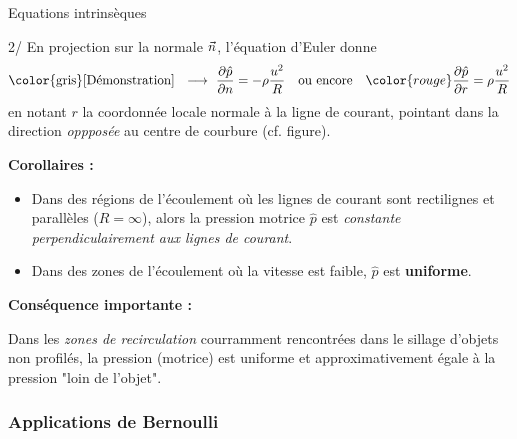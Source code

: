 \begin{frame}{Equations intrinsèques }
\pause

\smallskip

2/ En projection sur la normale $\vec{n}$, l'équation d'Euler
donne
\[
  \mbox{\color{gris} [Démonstration] \; $\longrightarrow$ \;}
  \frac{\partial \hat{p}}{\partial n} = - \rho \frac{u^2}{R}
  \quad \mbox{ou encore} \quad
  \color{rouge}
  \frac{\partial \hat{p}}{\partial r} = \rho \frac{u^2}{R}
\]
en notant $r$ la coordonnée locale normale à la ligne de courant, pointant
dans la direction \textsl{oppposée} au centre de courbure (cf. figure). 

\pause

\medskip

{\bf Corollaires  :}

\begin{itemize}

\item 
Dans des régions de l'écoulement o\`u les lignes de courant sont rectilignes et parallèles 
($R=\infty$), alors la pression motrice $\hat{p}$ est \textsl{constante perpendiculairement aux lignes de courant}. 

\item Dans des zones de l'écoulement où la vitesse est faible, $\hat{p}$ est {\bf uniforme}.
\end{itemize}

\pause

\smallskip

{\bf Conséquence importante :}

Dans les {\em zones de recirculation} courramment rencontrées dans le sillage d'objets non profilés, la pression (motrice) est uniforme et approximativement égale à la pression "loin de l'objet". 


\vspace{0mm}

\end{frame}


\subsubsection{Applications de Bernoulli}

